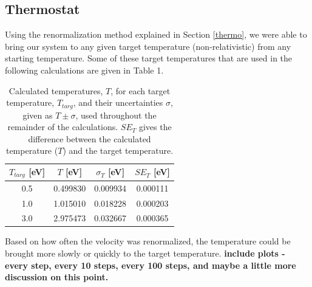\documentclass{article}
\begin{document}
\begin{multicols}{2}
\subsection{Thermostat}

Using the renormalization method explained in Section \ref{thermo}, we were able to bring our system to any given target temperature (non-relativistic) from any starting temperature.  Some of these target temperatures that are used in the following calculations are given in Table 1.  \\

\begin{table}
\begin{center}
\begin{tabular}{| c | c | c | c |}
\hline $T_{targ}$ [eV] & $T$ [eV] & $\sigma_T$ [eV] & $SE_T$ [eV] \\ \hline
 0.5 & 0.499830 & 0.009934 & 0.000111 \\ \hline
1.0 & 1.015010 & 0.018228 & 0.000203  \\ \hline
3.0 & 2.975473 & 0.032667 & 0.000365 \\ \hline
\end{tabular}
\label{temptable}
\caption{Calculated temperatures, $T$, for each target temperature, $T_{targ}$, and their uncertainties $\sigma$, given as $T \pm \sigma$, used throughout the remainder of the calculations.  $SE_T$ gives the difference between the calculated temperature ($T$) and the target temperature.}
\end{center}
\end{table}

Based on how often the velocity was renormalized, the temperature could be brought more slowly or quickly to the target temperature.  \textbf{include plots - every step, every 10 steps, every 100 steps, and maybe a little more discussion on this point.}


\end{multicols}
\end{document}
